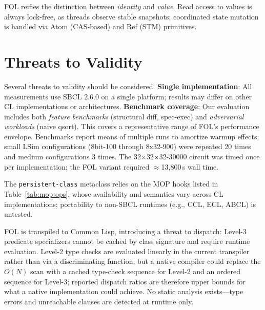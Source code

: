 \documentclass[sigconf,nonacm]{acmart}
\begin{document}
FOL reifies the distinction between \textit{identity} and \textit{value}. Read access to values is always lock-free, as threads observe stable snapshots; coordinated state mutation is handled via Atom (CAS-based) and Ref (STM) primitives.

\section{Threats to Validity}
\label{sec:threats}

Several threats to validity should be considered. \textbf{Single implementation}: All measurements use SBCL 2.6.0 on a single platform; results may differ on other CL implementations or architectures. \textbf{Benchmark coverage}: Our evaluation includes both \emph{feature benchmarks} (structural diff, spec-exec) and \emph{adversarial workloads} (naive qsort). This covers a representative range of FOL's performance envelope. Benchmarks report means of multiple runs to amortize warmup effects; small LSim configurations (8bit-100 through 8x32-900) were repeated 20 times and medium configurations 3 times. The 32$\times$32$\times$32-30000 circuit was timed once per implementation; the FOL variant required ${\approx}$13{,}800\,s wall time.

The \texttt{persistent-class} metaclass relies on the MOP hooks listed in Table~\ref{tab:mop-ops}, whose availability and semantics vary across CL implementations; portability to non-SBCL runtimes (e.g., CCL, ECL, ABCL) is untested.

FOL is transpiled to Common Lisp, introducing a threat to dispatch: Level-3 predicate specializers cannot be cached by class signature and require runtime evaluation. Level-2 type checks are evaluated linearly in the current transpiler rather than via a discriminating function, but a native compiler could replace the $O(N)$ scan with a cached type-check sequence for Level-2 and an ordered sequence for Level-3; reported dispatch ratios are therefore upper bounds for what a native implementation could achieve. No static analysis exists---type errors and unreachable clauses are detected at runtime only.
\end{document}
